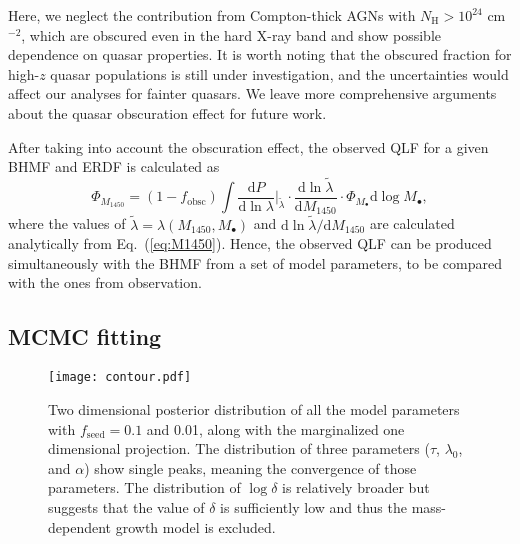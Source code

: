 \documentclass[twocolumn, twocolappendix]{aastex63}
\newcommand{\Mbh}{M_\bullet}
\newcommand{\fseed}{f_\mathrm{seed}}
\newcommand{\fobsc}{f_\mathrm{obsc}}
\newcommand{\Muv}{M_{1450}}
\newcommand{\D}{\mathrm{d}}
\begin{document}
\begin{CJK*}{UTF8}{gbsn}
Here, we neglect the contribution from Compton-thick AGNs with $N_\mathrm{H}>10^{24}$ cm$^{-2}$, 
which are obscured even in the hard X-ray band and show possible dependence on quasar properties.
It is worth noting that the obscured fraction for high-$z$ quasar populations is still under investigation,
and the uncertainties would affect our analyses for fainter quasars.
We leave more comprehensive arguments about the quasar obscuration effect for future work.

After taking into account the obscuration effect, 
the observed QLF for a given BHMF and ERDF is calculated as
\begin{equation}
\label{eq:dn_dM1450}
\Phi_{\Muv} 
 = (1 -\fobsc)  %
\int \frac{\D P}{\D \ln \lambda}\Big|_{\tilde{\lambda}}  \cdot
\frac{\D \ln \tilde{\lambda}}{\D \Muv} \cdot
 \Phi_{\Mbh} \D \log \Mbh,
\end{equation}
%
where the values of $\tilde{\lambda}=\lambda(\Muv, \Mbh)$ and $\D \ln \tilde{\lambda}/\D \Muv$ are calculated analytically from Eq.~(\ref{eq:M1450}).
%
Hence, the observed QLF can be produced simultaneously with the BHMF from a set of model parameters, 
to be compared with the ones from observation.




\vspace{2mm}
\subsection{MCMC fitting}\label{sec:fitting}

\begin{figure*}
\centering
\texttt{[image: contour.pdf]}
\caption{
Two dimensional posterior distribution of all the model parameters with $\fseed=0.1$ and 0.01, 
along with the marginalized one dimensional projection.
The distribution of three parameters ($\tau$, $\lambda_0$, and $\alpha$) show single peaks,
meaning the convergence of those parameters.
The distribution of $\log\delta$ is relatively broader but suggests that the value of $\delta$
is sufficiently low and thus the mass-dependent growth model is excluded.
}
\label{fig:contour}
\vspace{5mm}
\end{figure*}
%



\end{CJK*}
\end{document}
